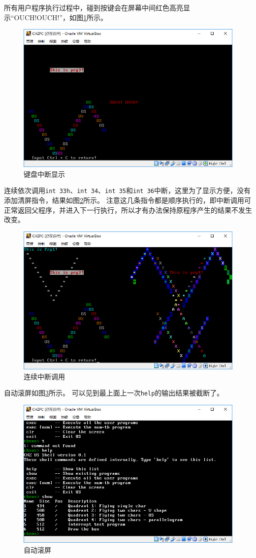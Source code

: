 \documentclass[logo,reportComp]{thesis}
\begin{document}
所有用户程序执行过程中，碰到按键会在屏幕中间红色高亮显示``OUCH!OUCH!''，如图\ref{fig:ouch}所示。
\begin{figure}[H]
\centering
\includegraphics[width=0.8\linewidth]{fig/ouch.PNG}
\caption{键盘中断显示}
\label{fig:ouch}
\end{figure}

连续依次调用\verb'int 33h'、\verb'int 34'、\verb'int 35'和\verb'int 36'中断，这里为了显示方便，没有添加清屏指令，结果如图\ref{fig:int_4}所示。
注意这几条指令都是顺序执行的，即中断调用可正常返回父程序，并进入下一行执行，所以才有办法保持原程序产生的结果不发生改变。
\begin{figure}[H]
\centering
\includegraphics[width=0.8\linewidth]{fig/int_4.PNG}
\caption{连续中断调用}
\label{fig:int_4}
\end{figure}

自动滚屏如图\ref{fig:sroll_down}所示。
可以见到最上面上一次\verb'help'的输出结果被截断了。
\begin{figure}[H]
\centering
\includegraphics[width=0.8\linewidth]{fig/sroll_down.PNG}
\caption{自动滚屏}
\label{fig:sroll_down}
\end{figure}
\end{document}
